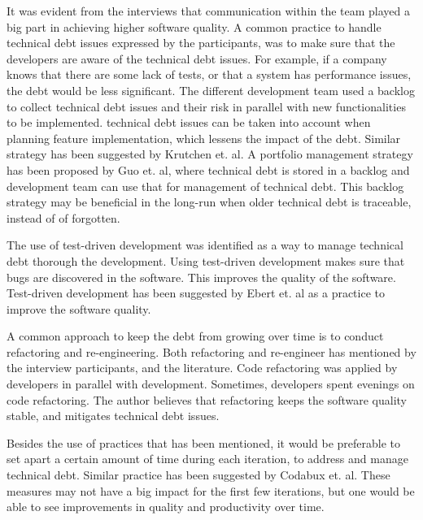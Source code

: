 It was evident from the interviews that communication within the team played a big part in achieving higher software quality. A common practice to handle technical debt issues expressed by the participants, was to make sure that the developers are aware of the technical debt issues. For example, if a company knows that there are some lack of tests, or that a system has performance issues, the debt would be less significant. The different development team used a backlog to collect technical debt issues and their risk in parallel with new functionalities to be implemented. technical debt issues can be taken into account when planning feature implementation, which lessens the impact of the debt. Similar strategy has been suggested by Krutchen et. al\cite{krutchen}. A portfolio management strategy has been proposed by Guo et. al\cite{guo2011tracking}, where technical debt is stored in a backlog and development team can use that for management of technical debt. This backlog strategy may be beneficial in the long-run when older technical debt is traceable, instead of of forgotten.

The use of test-driven development was identified as a way to manage technical debt thorough the development. Using test-driven development makes sure that bugs are discovered in the software. This improves the quality of the software. Test-driven development has been suggested by Ebert et. al\cite{ebert2009embedded} as a practice to improve the software quality.

A common approach to keep the debt from growing over time is to conduct refactoring and re-engineering. Both refactoring and re-engineer has mentioned by the interview participants, and the literature\cite{p8-codabux}. Code refactoring was applied by developers in parallel with development. Sometimes, developers spent evenings on code refactoring. The author believes that refactoring keeps the software quality stable, and mitigates technical debt issues. 

Besides the use of practices that has been mentioned, it would be preferable to set apart a certain amount of time during each iteration, to address and manage technical debt. Similar practice has been suggested by Codabux et. al\cite{p8-codabux}. These measures may not have a big impact for the first few iterations, but one would be able to see improvements in quality and productivity over time. 


